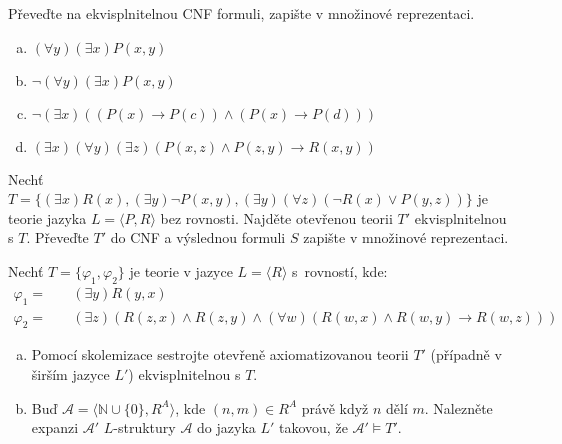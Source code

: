 \begin{problem} 
    
    Převeďte na ekvisplnitelnou CNF formuli, zapište v množinové reprezentaci.

    \begin{enumerate}[(a)]
        \item $(\forall y)(\exists x)P(x,y)$
        \item $\neg (\forall y)(\exists x)P(x,y)$
        \item $\neg (\exists x)((P(x)\to P(c))\wedge (P(x)\to P(d)))$
        \item $(\exists x)(\forall y)(\exists z)(P(x,z)\wedge P(z,y) \to R(x,y))$
    \end{enumerate}

    \begin{solution}
                    
    \end{solution}

\end{problem}

      
\begin{problem}
    
    Nechť $T=\{(\exists x)R(x), (\exists y)\neg P(x,y), (\exists y)(\forall z)(\neg R(x)\vee P(y,z))\}$ je teorie jazyka $L=\langle P,R\rangle$ bez rovnosti. Najděte otevřenou teorii $T'$ ekvisplnitelnou s $T$. Převeďte $T'$ do CNF a výslednou formuli $S$ zapište v množinové reprezentaci.

    \begin{solution}
                    
    \end{solution}

\end{problem}


\begin{problem}

    Nechť $T=\{\varphi_1,\varphi_2\}$ je teorie v jazyce $L=\langle R\rangle$ s~rovností, kde:
    \begin{align*}
    \varphi_1=&\quad (\exists y)R(y,x)\\
    \varphi_2=&\quad (\exists z)(R(z,x)\wedge R(z,y)\wedge (\forall w)(R(w,x) \wedge R(w,y)\to R(w,z)))
    \end{align*}
    \begin{enumerate}[(a)]
        \item Pomocí skolemizace sestrojte otevřeně axiomatizovanou teorii $T'$ (případně v širším jazyce $L'$) ekvisplnitelnou s $T$.
        \item Buď $\mathcal{A}=\langle\mathbb{N}\cup\{0\},R^A\rangle$, kde $(n,m)\in R^A$ právě když $n$ dělí $m$.  Nalezněte expanzi $\mathcal{A}'$ $L$-struktury $\mathcal{A}$ do jazyka $L'$ takovou, že $\mathcal{A}'\models T'$.
    \end{enumerate}

\end{problem}


